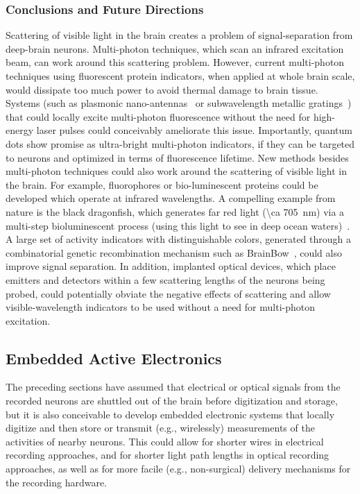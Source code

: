 \subsubsection{Conclusions and Future Directions}

Scattering of visible light in the brain creates a problem of signal-separation from deep-brain neurons.
Multi-photon techniques, which scan an infrared excitation beam, can work around this scattering problem.
However, current multi-photon techniques using fluorescent protein indicators, when applied at whole brain scale, would dissipate too much power to avoid thermal damage to brain tissue.
Systems (such as plasmonic nano-antennas~\cite{blanchard11} or subwavelength metallic gratings~\cite{Harats11}) that could locally excite multi-photon fluorescence without the need for high-energy laser pulses could conceivably ameliorate this issue. 
Importantly, quantum dots show promise as ultra-bright multi-photon indicators, if they can be targeted to neurons and optimized in terms of fluorescence lifetime.
New methods besides multi-photon techniques could also work around the scattering of visible light in the brain.
For example, fluorophores or bio-luminescent proteins could be developed which operate at infrared wavelengths.
A compelling example from nature is the black dragonfish, which generates far red light (\SI{\ca 705}{\nano\meter}) via a multi-step bioluminescent process (using this light to see in deep ocean waters)~\cite{widder84,campbell87}.
A large set of activity indicators with distinguishable colors, generated through a combinatorial genetic recombination mechanism such as BrainBow~\cite{livet07}, could also improve signal separation.
In addition, implanted optical devices, which place emitters and detectors within a few scattering lengths of the neurons being probed, could potentially obviate the negative effects of scattering and allow visible-wavelength indicators to be used without a need for multi-photon excitation.

\subsection{Embedded Active Electronics}

The preceding sections have assumed that electrical or optical signals from the recorded neurons are shuttled out of the brain before digitization and storage, but it is also conceivable to develop embedded electronic systems that locally digitize and then store or transmit (e.g., wirelessly) measurements of the activities of nearby neurons.
This could allow for shorter wires in electrical recording approaches, and for shorter light path lengths in optical recording approaches, as well as for more facile (e.g., non-surgical) delivery mechanisms for the recording hardware.

